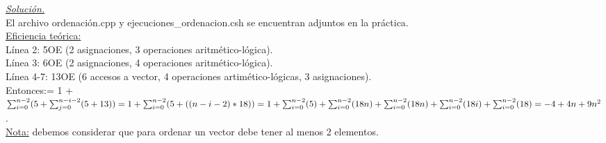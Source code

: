\documentclass[titlepage, 12pt,a4paper]{article}
\begin{document}
\underline{\emph{Solución.}}\\
El archivo ordenación.cpp y ejecuciones\_ordenacion.csh se encuentran adjuntos en la práctica.\\

\underline{Eficiencia teórica:} \\
	Línea 2: 5OE (2 asignaciones, 3 operaciones aritmético-lógica).\\
	Línea 3: 6OE (2 asignaciones, 4 operaciones aritmético-lógica).\\
	Línea 4-7: 13OE (6 accesos a vector, 4 operaciones artimético-lógicas, 3 asignaciones).\\

Entonces:= 1 + $\sum_{i=0}^{n-2}(5+\sum_{j=0}^{n-i-2}(5+13))= 1 + \sum_{i=0}^{n-2}(5+((n-i-2)*18))= \\
1 + \sum_{i=0}^{n-2}(5) + \sum_{i=0}^{n-2}(18n)+\sum_{i=0}^{n-2}(18n)+ \sum_{i=0}^{n-2}(18i) + \sum_{i=0}^{n-2}(18) = -4 + 4n + 9 n^2$.\\

\small{\underline{Nota:} debemos considerar que para ordenar un vector debe tener al menos 2 elementos.}

	
\end{document}
